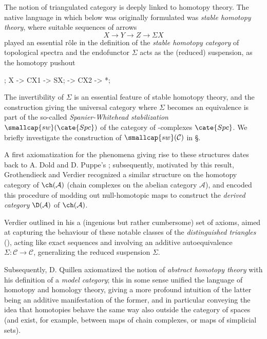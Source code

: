 \documentclass[11pt, a4paper]{amsart}
\renewcommand{\C}{\mathcal{C}}
\renewcommand{\A}{\mathcal{A}}
\begin{document}
The notion of triangulated category is deeply linked to homotopy theory. The native language in which \adef {} below was originally formulated was \emph{stable homotopy theory}, where suitable sequences of arrows
\[\label{dt}
X \to Y\to Z\to \Sigma X
\]
played an essential r\^ole in the definition of the \emph{stable homotopy category} of topological spectra and the endofunctor $\Sigma$ acts as the (reduced) suspension, \ie as the homotopy pushout
\begin{center}
\label{redsusp}
\begin{kD}
;
\mor X -> CX1 -> SX;
\mor * -> CX2 -> *;
\end{kD}
\end{center}
The invertibility of $\Sigma$ is an essential feature of stable homotopy theory, and the construction giving the universal category where $\Sigma$ becomes an equivalence is part of the so-called \emph{Spanier-Whitehead stabilization} $\smallcap{sw}(\cate{Spc})$ of the category of -complexes $\cate{Spc}$. We briefly investigate the construction of $\smallcap{sw}(\C)$ in \S{}.

A first axiomatization for the phenomena giving rise to these structures dates back to A\@. Dold and D\@. Puppe's \cite{Dold1961}; subsequently, motivated by this result, Grothendieck and Verdier recognized a similar structure on the homotopy category of $\ch(\A)$ (chain complexes on the abelian category $\A$), and encoded this procedure of modding out null-homotopic maps to construct the \emph{derived category} $\D(\A)$ of $\ch(\A)$.

Verdier outlined in his \cite{VerdierDesDes} a (ingenious but rather cumbersome) set of axioms, aimed at capturing the behaviour of these notable classes of the \emph{distinguished triangles} (), acting like exact sequences and involving an additive autoequivalence $\Sigma \colon \C\to \C$,  generalizing the reduced suspension $\Sigma$.

Subsequently, D\@. Quillen axiomatized the notion of \emph{abstract homotopy theory} \cite{Baues1989} with his definition of a \emph{model category}; this in some sense unified the language of homotopy and homology theory, giving a more profound intuition of the latter being an additive manifestation of the former, and in particular conveying the idea that homotopies behave the same way also outside the category of spaces (and exist, for example, between maps of chain complexes, or maps of simplicial sets).
\end{document}
